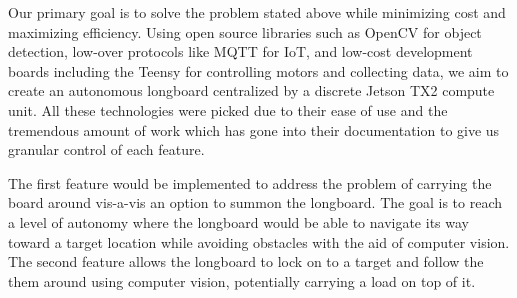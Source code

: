 Our primary goal is to solve the problem stated above while minimizing cost and maximizing efficiency. Using open source libraries such as OpenCV for object detection, low-over protocols like MQTT for IoT, and low-cost development boards including the Teensy for controlling motors and collecting data, we aim to create an autonomous longboard centralized by a discrete Jetson TX2 compute unit. All these technologies were picked due to their ease of use and the tremendous amount of work which has gone into their documentation to give us granular control of each feature.

The first feature would be implemented to address the problem of carrying the board around vis-a-vis an option to summon the longboard. The goal is to reach a level of autonomy where the longboard would be able to navigate its way toward a target location while avoiding obstacles with the aid of computer vision. The second feature allows the longboard to lock on to a target and follow the them around using computer vision, potentially carrying a load on top of it.